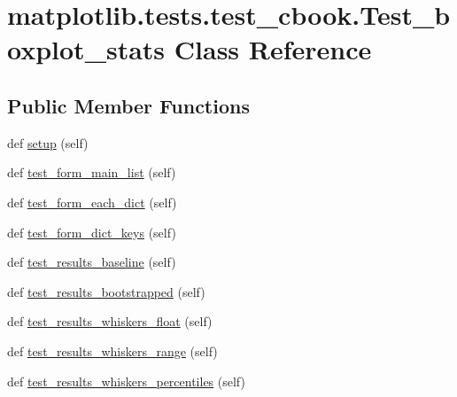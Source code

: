 \hypertarget{classmatplotlib_1_1tests_1_1test__cbook_1_1Test__boxplot__stats}{}\section{matplotlib.\+tests.\+test\+\_\+cbook.\+Test\+\_\+boxplot\+\_\+stats Class Reference}
\label{classmatplotlib_1_1tests_1_1test__cbook_1_1Test__boxplot__stats}
\subsection*{Public Member Functions}
\begin{DoxyCompactItemize}
\item 
def \hyperlink{classmatplotlib_1_1tests_1_1test__cbook_1_1Test__boxplot__stats_a2030a1b1e0c7919cf81c7ca0a86a945c}{setup} (self)
\item 
def \hyperlink{classmatplotlib_1_1tests_1_1test__cbook_1_1Test__boxplot__stats_a280edd2f9ee05f80d3f659f88507de6b}{test\+\_\+form\+\_\+main\+\_\+list} (self)
\item 
def \hyperlink{classmatplotlib_1_1tests_1_1test__cbook_1_1Test__boxplot__stats_a1bccdbcc0781b5ae461985a9f68dd2ac}{test\+\_\+form\+\_\+each\+\_\+dict} (self)
\item 
def \hyperlink{classmatplotlib_1_1tests_1_1test__cbook_1_1Test__boxplot__stats_a3e2a32774509ca3fa6bd1d127429adc0}{test\+\_\+form\+\_\+dict\+\_\+keys} (self)
\item 
def \hyperlink{classmatplotlib_1_1tests_1_1test__cbook_1_1Test__boxplot__stats_a098dbf7b7cf3cd943c645002ce381efe}{test\+\_\+results\+\_\+baseline} (self)
\item 
def \hyperlink{classmatplotlib_1_1tests_1_1test__cbook_1_1Test__boxplot__stats_a47e915a5d4a453b0279bb0b172bf088f}{test\+\_\+results\+\_\+bootstrapped} (self)
\item 
def \hyperlink{classmatplotlib_1_1tests_1_1test__cbook_1_1Test__boxplot__stats_a593010fc59f31b9eb7c6a628f69c7df7}{test\+\_\+results\+\_\+whiskers\+\_\+float} (self)
\item 
def \hyperlink{classmatplotlib_1_1tests_1_1test__cbook_1_1Test__boxplot__stats_ae6878ca68df75e25d1373e85ac0a9bc3}{test\+\_\+results\+\_\+whiskers\+\_\+range} (self)
\item 
def \hyperlink{classmatplotlib_1_1tests_1_1test__cbook_1_1Test__boxplot__stats_ad66f7cf5eda2431da406b1071270466b}{test\+\_\+results\+\_\+whiskers\+\_\+percentiles} (self)

\end{DoxyCompactItemize}
